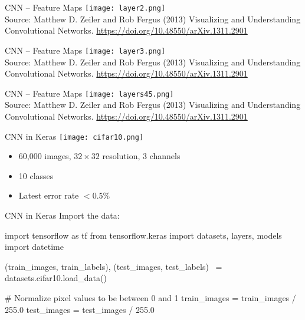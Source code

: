 \documentclass[ignorenonframetext,xcolor=x11names]{beamer}
\begin{document}
\begin{frame}{CNN -- Feature Maps}
\centering
\texttt{[image: layer2.png]} \\
\vspace{\baselineskip}
\scriptsize Source: Matthew D. Zeiler and Rob Fergus (2013) Visualizing and Understanding Convolutional Networks. \url{https://doi.org/10.48550/arXiv.1311.2901}
\end{frame}

\begin{frame}{CNN -- Feature Maps}
\centering
\texttt{[image: layer3.png]} \\
\vspace{\baselineskip}
\scriptsize Source: Matthew D. Zeiler and Rob Fergus (2013) Visualizing and Understanding Convolutional Networks. \url{https://doi.org/10.48550/arXiv.1311.2901}
\end{frame}

\begin{frame}{CNN -- Feature Maps}
\centering
\texttt{[image: layers45.png]} \\
\vspace{0.5\baselineskip}
\scriptsize Source: Matthew D. Zeiler and Rob Fergus (2013) Visualizing and Understanding Convolutional Networks. \url{https://doi.org/10.48550/arXiv.1311.2901}
\end{frame}

\begin{frame}{CNN in Keras}
\centering
\texttt{[image: cifar10.png]}
\begin{itemize}
   \item 60,000 images, $32 \times 32$ resolution, 3 channels
   \item 10 classes
   \item Latest error rate $< 0.5\%$
\end{itemize}
\end{frame}

\begin{frame}[fragile]{CNN in Keras}
Import the data:
\begin{pythoncode}
import tensorflow as tf
from tensorflow.keras import datasets, layers, models
import datetime

(train_images, train_labels), (test_images, test_labels) \
    = datasets.cifar10.load_data()

# Normalize pixel values to be between 0 and 1
train_images = train_images / 255.0
test_images = test_images / 255.0
\end{pythoncode}
\end{frame}
\end{document}
